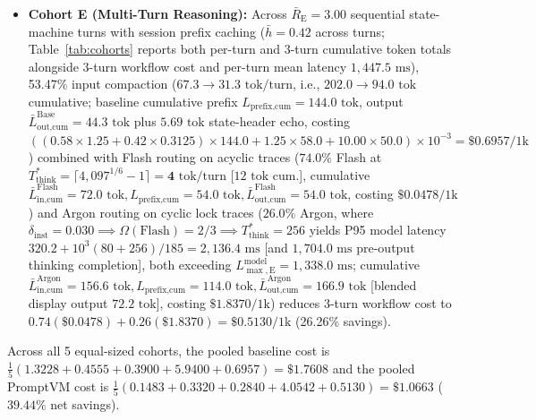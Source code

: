 \documentclass[conference,10pt]{IEEEtran}
\begin{document}
\begin{itemize}
    \item \textbf{Cohort E (Multi-Turn Reasoning):} Across $\bar{R}_{\text{E}} = 3.00$ sequential state-machine turns with session prefix caching ($\bar{h}=0.42$ across turns; Table~\ref{tab:cohorts} reports both per-turn and 3-turn cumulative token totals alongside 3-turn workflow cost and per-turn mean latency $1{,}447.5\text{ ms}$), 53.47\% input compaction ($67.3 \to 31.3\text{ tok/turn}$, i.e., $202.0 \to 94.0\text{ tok}$ cumulative; baseline cumulative prefix $L_{\text{prefix,cum}}=144.0\text{ tok}$, output $\bar{L}_{\text{out,cum}}^{\text{Base}} = 44.3\text{ tok}$ plus $5.69\text{ tok}$ state-header echo, costing $((0.58\times 1.25 + 0.42\times 0.3125)\times 144.0 + 1.25\times 58.0 + 10.00\times 50.0)\times 10^{-3} = \$0.6957/\text{1k}$) combined with Flash routing on acyclic traces ($74.0\%$ Flash at $T_{\text{think}}^* = \lceil 4{,}097^{1/6} - 1 \rceil = \mathbf{4}\text{ tok/turn}$ [$12\text{ tok}$ cum.], cumulative $\bar{L}_{\text{in,cum}}^{\text{Flash}} = 72.0\text{ tok}, L_{\text{prefix,cum}}=54.0\text{ tok}, \bar{L}_{\text{out,cum}}^{\text{Flash}} = 54.0\text{ tok}$, costing $\$0.0478/\text{1k}$) and Argon routing on cyclic lock traces ($26.0\%$ Argon, where $\delta_{\text{inst}}=0.030 \implies \Omega(\text{Flash})=2/3 \implies T_{\text{think}}^*=256$ yields P95 model latency $320.2 + 10^3(80+256)/185 = 2{,}136.4\text{ ms}$ [and $1{,}704.0\text{ ms}$ pre-output thinking completion], both exceeding $L_{\max,\text{E}}^{\text{model}} = 1{,}338.0\text{ ms}$; cumulative $\bar{L}_{\text{in,cum}}^{\text{Argon}} = 156.6\text{ tok}, L_{\text{prefix,cum}}=114.0\text{ tok}, \bar{L}_{\text{out,cum}}^{\text{Argon}} = 166.9\text{ tok}$ [blended display output $72.2\text{ tok}$], costing $\$1.8370/\text{1k}$) reduces 3-turn workflow cost to $0.74(\$0.0478) + 0.26(\$1.8370) = \$0.5130/\text{1k}$ (26.26\% savings).
\end{itemize}
Across all 5 equal-sized cohorts, the pooled baseline cost is $\frac{1}{5}(1.3228 + 0.4555 + 0.3900 + 5.9400 + 0.6957) = \$1.7608$ and the pooled PromptVM cost is $\frac{1}{5}(0.1483 + 0.3320 + 0.2840 + 4.0542 + 0.5130) = \$1.0663$ ($39.44\%$ net savings).
\end{document}
